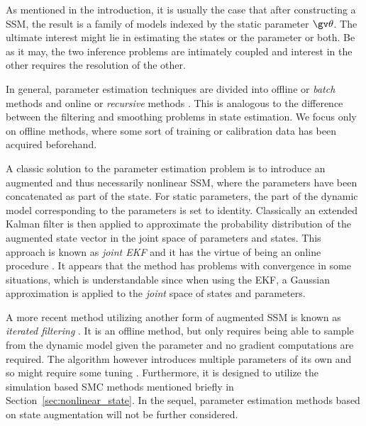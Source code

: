 
As mentioned in the introduction, it is usually the case that
after constructing a SSM, the result is a family of models
indexed by the static parameter $\Th$. The ultimate interest might lie in estimating
the states or the parameter or both. Be as it may, the two inference problems are intimately
coupled and interest in the other requires the resolution of the other.

In general, parameter estimation techniques are divided
into offline or \emph{batch} methods and online or \emph{recursive} methods
\parencite{Cappe2007,Kantas2009}. This is analogous to the difference between the filtering and 
smoothing problems in state estimation. We focus only on offline methods, where some 
sort of training or calibration data has been acquired beforehand.

A classic solution to the parameter estimation problem is to introduce
an augmented and thus necessarily nonlinear SSM, where the parameters have been concatenated as part of the
state. For static parameters, the part of the dynamic model corresponding to the parameters is
set to identity. Classically an extended Kalman filter is 
then applied to approximate the probability distribution of the augmented state
vector in the joint space of parameters and states. This approach is known
as \emph{joint EKF} and it has the virtue of being an online procedure \parencite{Wan2001}.
It appears that the method has problems with convergence in some situations, which is understandable
since when using the EKF, a Gaussian approximation
is applied to the \emph{joint} space of states and parameters.

A more recent method utilizing another form of augmented SSM is known as \emph{iterated filtering}
\parencite{Ionides2011}. It is an offline method, but only requires being able
to sample from the dynamic model given the parameter and no gradient computations
are required. The algorithm however introduces multiple parameters of its own
and so might require some tuning \parencite{Kantas2009}. Furthermore, it is designed
to utilize the simulation based SMC methods mentioned briefly in Section~\ref{sec:nonlinear_state}.
In the sequel, parameter estimation methods based on state augmentation 
will not be further considered. 




